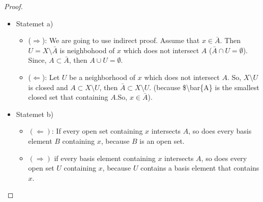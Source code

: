 \documentclass[
]{book}
\providecommand{\tightlist}{%
  \setlength{\itemsep}{0pt}\setlength{\parskip}{0pt}}
\theoremstyle{definition}
\theoremstyle{definition}
\theoremstyle{definition}
\theoremstyle{definition}
\theoremstyle{remark}
\begin{document}
\begin{proof}
\leavevmode

\begin{itemize}
\tightlist
\item
  Statemet a)

  \begin{itemize}
  \tightlist
  \item
    (\(\Longrightarrow\)): We are going to use indirect proof. Assume that \(x\in \bar{A}\). Then \(U=X\setminus \bar{A}\) is neighbohood of \(x\) which does not intersect \(A\) (\(\bar{A} \cap U=\emptyset\)). Since, \(A\subset \bar{A}\), then \(A \cup U =\emptyset\).
  \item
    (\(\Longleftarrow\)):
    Let \(U\) be a neighborhood of \(x\) which does not intersect \(A\). So, \(X\setminus U\) is closed and \(A\subset X\setminus U\), then \(\bar{A}\subset X\setminus U\). (because \$\textbackslash bar\{A\} is the smallest closed set that containing \(A\).So, \(x\in \bar{A}\)).
  \end{itemize}
\item
  Statemet b)

  \begin{itemize}
  \item
    \((\Longleftarrow)\): If every open set containing \(x\) intersects \(A\), so does
    every basis element \(B\) containing \(x\), because \(B\) is an open set.
  \item
    \((\Longrightarrow)\) if every
    basis element containing \(x\) intersects \(A\), so does every open set \(U\) containing \(x\), because \(U\) contains a basis element that contains \(x\).
  \end{itemize}
\end{itemize}

\end{proof}
\end{document}

